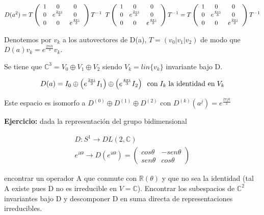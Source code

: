 $$D(a^2)=T\left ( \begin{array}{ccc}
1 & 0 & 0 \\
0 & e^{\frac{2\pi i}{3}} & 0 \\
0 & 0 & e^{\frac{4\pi i}{3}}
\end{array}\right )T^{-1} \hspace{0.2cm} T\left ( \begin{array}{ccc}
1 & 0 & 0 \\
0 & e^{\frac{2\pi i}{3}} & 0 \\
0 & 0 & e^{\frac{4\pi i}{3}}
\end{array}\right )T^{-1}=T\left ( \begin{array}{ccc}
1 & 0 & 0 \\
0 & e^{\frac{4\pi i}{3}} & 0 \\
0 & 0 & e^{\frac{2\pi i}{3}}
\end{array}\right )T^{-1}$$

\smallskip
Denotemos por $v_k$ a los autovectores de D(a), $T=(v_0 |v_1 | v_2)$ de modo que $D(a)v_k=e^{\frac{2\pi i k}{3}} v_k$.

\smallskip
Se tiene que $\mathds{C}^3=V_0\oplus V_1 \oplus V_2$ siendo $V_k=lin\lbrace v_k \rbrace$ invariante bajo D.

$$D(a)=I_0 \oplus \left ( e^{\frac{2\pi i}{3}}I_1\right) \oplus \left( e^{\frac{4\pi i}{3}}I_2\right) \hspace{0.2cm} \text{con} \hspace{0.1cm} I_k \hspace{0.1cm} \text{la identidad en} \hspace{0.1cm} V_k$$

Este espacio es isomorfo a $D^{(0)}\oplus D^{(1)}\oplus D^{(2)}$ con $D^{(k)}(a^j)=e^{\frac{2\pi jk}{3}}$

\bigskip
\textbf{Ejercicio:} dada la representación del grupo bidimensional

$$\begin{array}{cc}
D: S^1 \to DL(2, \mathds{C})  \\
e^{i\Theta}\to D(e^{i\Theta})= \left (\begin{array}{cc}
cos \theta  & -sen \theta  \\
sen \theta  & cos \theta
\end{array}\right )
\end{array}$$

encontrar un operador A que conmute con $\mathds{R}(\theta)$ y que no sea la identidad (tal A existe pues D no es irreducible en $V=\mathds{C}$). Encontrar los subespacios de $\mathds{C}^2$ invariantes bajo D y descomponer D en suma directa de representaciones irreducibles.

